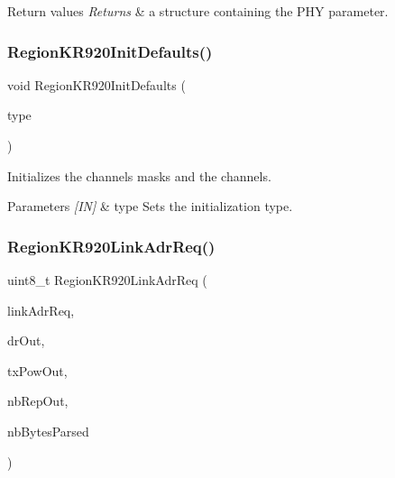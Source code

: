 \begin{DoxyRetVals}{Return values}
{\em Returns} & a structure containing the P\+HY parameter. \\
\hline
\end{DoxyRetVals}
\mbox{\label{group__REGIONKR920_gad6e5f4b30063e9fbd8f6e1b6dea1444d}} 
\subsubsection{\texorpdfstring{Region\+K\+R920\+Init\+Defaults()}{RegionKR920InitDefaults()}}
{\footnotesize\ttfamily void Region\+K\+R920\+Init\+Defaults (\begin{DoxyParamCaption}\item[{\hyperlink{group__REGION_gaddc73ae10673ec925724e7870363bda9}{Init\+Type\+\_\+t}}]{type }\end{DoxyParamCaption})}



Initializes the channels masks and the channels. 


\begin{DoxyParams}{Parameters}
{\em \mbox{[}\+I\+N\mbox{]}} & type Sets the initialization type. \\
\hline
\end{DoxyParams}
\mbox{\label{group__REGIONKR920_ga6b2ee965ec46d0c137845d75edc16fd8}} 
\subsubsection{\texorpdfstring{Region\+K\+R920\+Link\+Adr\+Req()}{RegionKR920LinkAdrReq()}}
{\footnotesize\ttfamily uint8\+\_\+t Region\+K\+R920\+Link\+Adr\+Req (\begin{DoxyParamCaption}\item[{\hyperlink{group__REGION_gad4af503e8d4de1846129e26a799a1e8e}{Link\+Adr\+Req\+Params\+\_\+t} $\ast$}]{link\+Adr\+Req,  }\item[{int8\+\_\+t $\ast$}]{dr\+Out,  }\item[{int8\+\_\+t $\ast$}]{tx\+Pow\+Out,  }\item[{uint8\+\_\+t $\ast$}]{nb\+Rep\+Out,  }\item[{uint8\+\_\+t $\ast$}]{nb\+Bytes\+Parsed }\end{DoxyParamCaption})}



